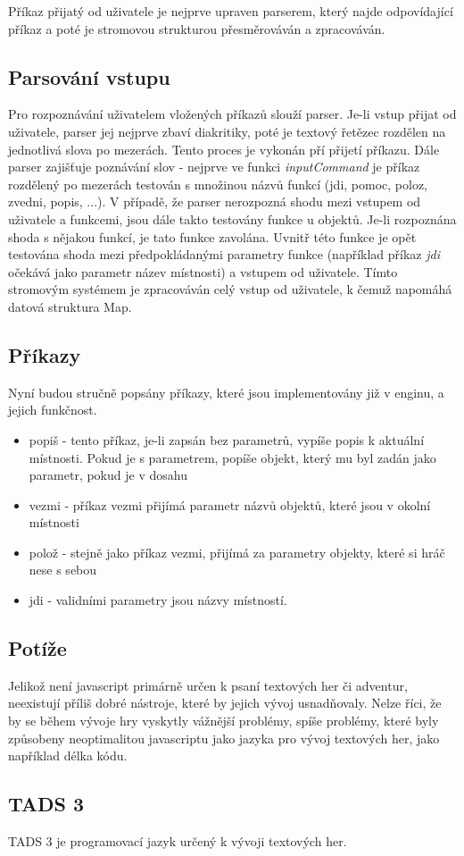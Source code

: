 \documentclass[main.tex]{subfiles}
\begin{document}
Příkaz přijatý od uživatele je nejprve upraven parserem, který najde odpovídající příkaz a poté je stromovou strukturou přesměrováván a zpracováván.

\subsection{Parsování vstupu}
Pro rozpoznávání uživatelem vložených příkazů slouží parser. Je-li vstup přijat od uživatele, parser jej nejprve zbaví diakritiky, poté je textový řetězec rozdělen na jednotlivá slova po mezerách. Tento proces je vykonán pří přijetí příkazu. Dále parser zajišťuje poznávání slov - nejprve ve funkci \textit{inputCommand} je příkaz rozdělený po mezerách testován s množinou názvů funkcí (jdi, pomoc, poloz, zvedni, popis, ...). V případě, že parser nerozpozná shodu mezi vstupem od uživatele a funkcemi, jsou dále takto testovány funkce u objektů. Je-li rozpoznána shoda s nějakou funkcí, je tato funkce zavolána. Uvnitř této funkce je opět testována shoda mezi předpokládanými parametry funkce (například příkaz \textit{jdi} očekává jako parametr název místnosti) a vstupem od uživatele. Tímto stromovým systémem je zpracováván celý vstup od uživatele, k čemuž napomáhá datová struktura Map.

\subsection{Příkazy}
Nyní budou stručně popsány příkazy, které jsou implementovány již v enginu, a jejich funkčnost.
\begin{itemize}
    \item popiš - tento příkaz, je-li zapsán bez parametrů, vypíše popis k aktuální místnosti. Pokud je s parametrem, popíše objekt, který mu byl zadán jako parametr, pokud je v dosahu 
    \item vezmi - příkaz vezmi přijímá parametr názvů objektů, které jsou v okolní místnosti
    \item polož - stejně jako příkaz vezmi, přijímá za parametry objekty, které si hráč nese s sebou
    \item jdi - validními parametry jsou názvy místností.
\end{itemize}

\subsection{Potíže}
Jelikož není javascript primárně určen k psaní textových her či adventur, neexistují příliš dobré nástroje, které by jejich vývoj usnadňovaly. Nelze říci, že by se během vývoje hry vyskytly vážnější problémy, spíše problémy, které byly způsobeny neoptimalitou javascriptu jako jazyka pro vývoj textových her, jako například délka kódu.

\subsection{TADS 3}
TADS 3 je programovací jazyk určený k vývoji textových her. 
\end{document}
